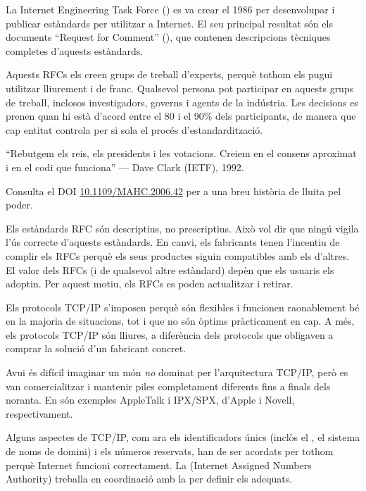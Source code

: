 La Internet Engineering Task Force () es va crear el 1986
per desenvolupar i publicar estàndards per utilitzar a Internet. 
% 
El seu principal resultat són els documents ``Request for Comment'' (),
que contenen descripcions tècniques completes d'aquests estàndards.


Aquests RFCs els creen grups de treball d'experts, 
perquè tothom els pugui utilitzar lliurement i de franc. 
% 
Qualsevol persona pot participar en aquests grups de treball, inclosos investigadors,
governs i agents de la indústria. 
% 
Les decisions es prenen quan hi està d'acord entre el 80 i el 90\% dels participants, de manera que cap 
entitat controla per si sola el procés d'estandardització.
% 
\begin{remark}
``Rebutgem els reis, els presidents i les votacions. 
Creiem en el consens aproximat i en el codi que funciona'' 
--- Dave Clark (IETF), 1992.

Consulta el DOI \href{https://dx.doi.org/10.1109/MAHC.2006.42}{\underline{10.1109/MAHC.2006.42}} per a 
una breu història de lluita pel poder.
\end{remark}

Els estàndards RFC són descriptius, no prescriptius. Això vol dir que ningú vigila l'ús correcte 
d'aquests estàndards. En canvi, els fabricants tenen l'incentiu de complir els RFCs 
perquè els seus productes siguin compatibles amb els d'altres. 
% 
El valor dels RFCs (i de qualsevol altre estàndard) depèn que
els usuaris els adoptin. Per aquest motiu, els RFCs es poden actualitzar i retirar.

Els protocols TCP/IP s'imposen perquè són flexibles i funcionen raonablement bé en la majoria de situacions, 
tot i que no són òptims pràcticament en cap. 
A més, els protocols TCP/IP són lliures, a diferència dels protocols 
que obligaven a comprar la solució d'un fabricant concret.
% 
\begin{remark}
Avui és difícil imaginar un món \textit{no} 
dominat per l'arquitectura TCP/IP, 
però es van comercialitzar i mantenir piles completament diferents fins a finals dels noranta.
En són exemples AppleTalk i IPX/SPX, d'Apple i Novell, respectivament.
\end{remark}


Alguns aspectes de TCP/IP, com ara els identificadors únics 
(inclòs el , el sistema de noms de domini)
i els números reservats, han de ser acordats per tothom perquè Internet funcioni correctament.
% 
La  (Internet Assigned Numbers Authority) treballa en coordinació amb la 
per definir els  adequats.

